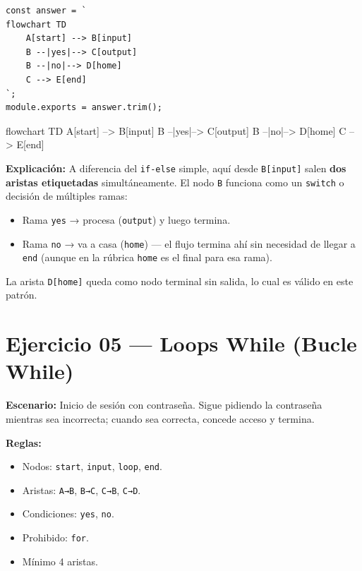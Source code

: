 \documentclass[10pt,a4paper]{article}
\newenvironment{mermaid}[1][]
  {%
   \begin{mdframed}[%
     linecolor=blue!50!black,
     backgroundcolor=blue!3,
     innertopmargin=6pt,
     innerbottommargin=6pt,
     leftmargin=0pt,
     rightmargin=0pt,
     skipabove=10pt,
     skipbelow=10pt,
     frametitle={Diagrama Mermaid},
     frametitlefont={\small\bfseries\color{blue!70!black}},
   ]%
   \small\ttfamily
  }
  {%
   \end{mdframed}%
  }
\begin{document}
\begin{lstlisting}[style=jsstyle]
const answer = `
flowchart TD
    A[start] --> B[input]
    B --|yes|--> C[output]
    B --|no|--> D[home]
    C --> E[end]
`;
module.exports = answer.trim();
\end{lstlisting}

\begin{mermaid}
flowchart TD
    A[start] --> B[input]
    B --|yes|--> C[output]
    B --|no|--> D[home]
    C --> E[end]
\end{mermaid}

\textbf{Explicación:}
A diferencia del \texttt{if-else} simple, aquí desde \texttt{B[input]}
salen \textbf{dos aristas etiquetadas} simultáneamente. El nodo
\texttt{B} funciona como un \texttt{switch} o decisión de múltiples
ramas:
\begin{itemize}
  \item Rama \texttt{yes} → procesa (\texttt{output}) y luego termina.
  \item Rama \texttt{no} → va a casa (\texttt{home}) — el flujo termina
        ahí sin necesidad de llegar a \texttt{end} (aunque en la rúbrica
        \texttt{home} es el final para esa rama).
\end{itemize}
La arista \texttt{D[home]} queda como nodo terminal sin salida, lo cual
es válido en este patrón.

\newpage

\section{Ejercicio 05 — Loops While (Bucle While)}

\textbf{Escenario:} Inicio de sesión con contraseña. Sigue pidiendo la
contraseña mientras sea incorrecta; cuando sea correcta, concede acceso
y termina.

\textbf{Reglas:}
\begin{itemize}
  \item Nodos: \texttt{start}, \texttt{input}, \texttt{loop},
        \texttt{end}.
  \item Aristas: \texttt{A→B}, \texttt{B→C}, \texttt{C→B},
        \texttt{C→D}.
  \item Condiciones: \texttt{yes}, \texttt{no}.
  \item Prohibido: \texttt{for}.
  \item Mínimo 4 aristas.
\end{itemize}
\end{document}
